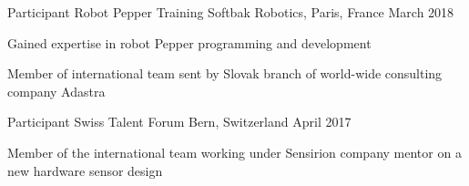 


\begin{cventries}
	
	
	\cventry
	{Participant} %
	{Robot Pepper Training} %
	{Softbak Robotics, Paris, France} %
	{March 2018} %
	{ %
		\begin{cvitems}
			\item {Gained expertise in robot Pepper programming and development}
			\item {Member of international team sent by Slovak branch of world-wide consulting company Adastra}
		\end{cvitems}
	}
	
	
	\cventry
	{Participant} %
	{Swiss Talent Forum} %
	{Bern, Switzerland} %
	{April 2017} %
	{ %
		\begin{cvitems}
			\item {Member of the international team working under Sensirion company mentor on a new hardware sensor design}
		\end{cvitems}
    }
	
\end{cventries}